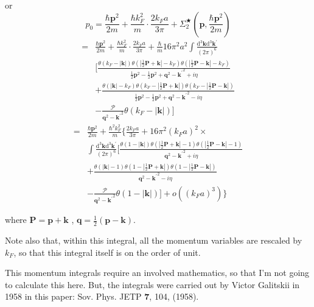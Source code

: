 or
\begin{equation} \label{Eqs2.7.32}
p_0 = \frac{\hbar \mathbf{p}^2}{2m}+\frac{\hbar k_F^2}{m}\cdot\frac{2 k_F a}{3\pi} + \Sigma_2^{\bigstar}(\mathbf{p},\frac{\hbar \mathbf{p}^2}{2m})
\end{equation}
\[ \begin{split}=&\frac{\hbar \mathbf{p}^2}{2m}+\frac{\hbar k_F^2}{m}\cdot\frac{2 k_F a}{3\pi} + \frac{\hbar}{m}16\pi^2 a^2 \int \frac{\mathrm{d}^3 \mathbf{k} \mathrm{d}^3 \mathbf{k}^{'} }{(2\pi)^6} \\
& [  \frac{\theta(k_F-|\mathbf{k}|)\theta(|\frac{1}{2}\mathbf{P}+\mathbf{k}|-k_F)\theta(|\frac{1}{2}\mathbf{P}-\mathbf{k}|-k_F)}{\frac{1}{2}\mathbf{p}^2-\frac{1}{2}\mathbf{p}^2+\mathbf{q}^2-{\mathbf{k}^{'}}^2+i \eta} \\
&+ \frac{\theta(|\mathbf{k}|-k_F)\theta(k_F-|\frac{1}{2}\mathbf{P}+\mathbf{k}|)\theta(k_F-|\frac{1}{2}\mathbf{P}-\mathbf{k}|)}{\frac{1}{2}\mathbf{p}^2-\frac{1}{2}\mathbf{p}^2+\mathbf{q}^2-{\mathbf{k}^{'}}^2-i \eta}\\
&-\frac{\mathscr{P}}{\mathbf{q}^2-{\mathbf{k}^{'}}^2}\theta(k_F-|\mathbf{k}|) ]
\end{split} \]
\begin{equation} \label{Eqs2.7.33} \begin{split}
=& \frac{\hbar \mathbf{p}^2}{2m} + \frac{\hbar^2 k_F^2}{m} \{ \frac{2 k_F a}{3\pi} + 16 \pi^2 (k_F a)^2 \times\\
&\int \frac{\mathrm{d}^3 \mathbf{k} \mathrm{d}^3 \mathbf{k}^{'} }{(2\pi)^6} [ \frac{\theta(1-|\mathbf{k}|)\theta(|\frac{1}{2}\mathbf{P}+\mathbf{k}|-1)\theta(|\frac{1}{2}\mathbf{P}-\mathbf{k}|-1)}{\mathbf{q}^2-{\mathbf{k}^{'}}^2+i \eta} \\
&+ \frac{\theta(|\mathbf{k}|-1)\theta(1-|\frac{1}{2}\mathbf{P}+\mathbf{k}|)\theta(1-|\frac{1}{2}\mathbf{P}-\mathbf{k}|)}{\mathbf{q}^2-{\mathbf{k}^{'}}^2-i \eta} \\
&-\frac{\mathscr{P}}{\mathbf{q}^2-{\mathbf{k}^{'}}^2}\theta(1-|\mathbf{k}|) ] + o\left( (k_F a)^3 \right)
\}
\end{split}\end{equation}

where $\mathbf{P}=\mathbf{p}+\mathbf{k}$
, $\mathbf{q}=\frac{1}{2}(\mathbf{p}-\mathbf{k})$.

Note also that, within this integral, all the momentum variables are rescaled by $k_F$, so that this integral itself is on the order of unit.

This momentum integrals require an involved mathematics, so that I'm not going to calculate this here. But, the integrals were carried out by Victor Galitskii in 1958 in this paper: Sov. Phys. JETP $\mathbf{7}$, 104, (1958).

